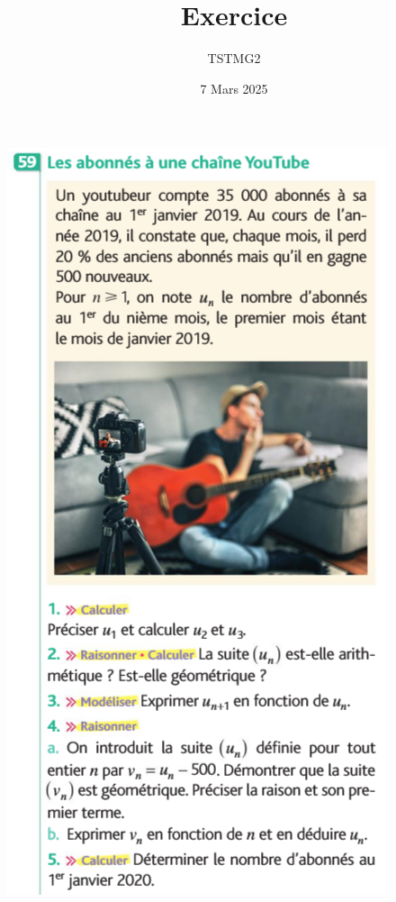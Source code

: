\documentclass{article}
\title{Exercice}
\author{TSTMG2}
\date{7 Mars 2025}
\begin{document}
\maketitle
\begin{center}
\begin{minipage}{0.45\textwidth}
\includegraphics[width=\textwidth]{Exercice_1.png}

\end{minipage}
\end{center}
\end{document}
